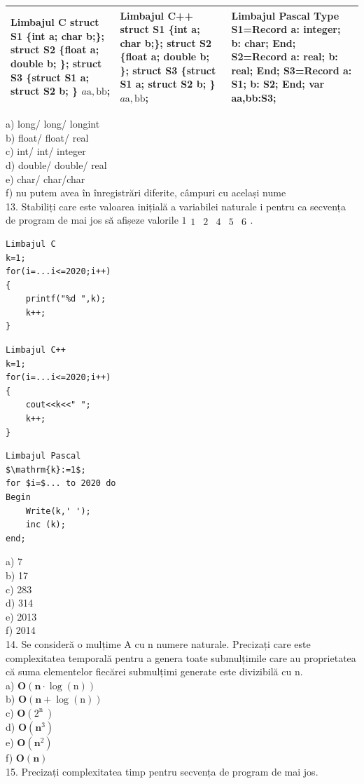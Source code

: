 \documentclass[10pt]{article}
\begin{document}
\begin{center}
\begin{tabular}{|l|l|l|}
\hline
Limbajul C struct S1 \{int a; char b;\}; struct S2 \{float a; double b; \}; struct S3 \{struct S1 a; struct S2 b; \} $a \mathrm{a}, \mathrm{bb}$; & Limbajul C++ struct S1 \{int a; char b;\}; struct S2 \{float a; double b; \}; struct S3 \{struct S1 a; struct S2 b; \} $a \mathrm{a}, \mathrm{bb}$; & Limbajul Pascal Type S1=Record a: integer; b: char; End; S2=Record a: real; b: real; End; S3=Record a: S1; b: S2; End; var aa,bb:S3; \\
\hline
\end{tabular}
\end{center}

a) long/ long/ longint\\
b) float/ float/ real\\
c) int/ int/ integer\\
d) double/ double/ real\\
e) char/ char/char\\
f) nu putem avea în înregistrări diferite, câmpuri cu același nume\\
13. Stabiliți care este valoarea inițială a variabilei naturale i pentru ca secvența de program de mai jos să afișeze valorile $1 \begin{array}{llllll}1 & 2 & 4 & 5 & 6\end{array}$.

\begin{verbatim}
Limbajul C
k=1;
for(i=...i<=2020;i++)
{
    printf("%d ",k);
    k++;
}
\end{verbatim}

\begin{verbatim}
Limbajul C++
k=1;
for(i=...i<=2020;i++)
{
    cout<<k<<" ";
    k++;
}
\end{verbatim}

\begin{verbatim}
Limbajul Pascal
$\mathrm{k}:=1$;
for $i=$... to 2020 do
Begin
    Write(k,' ');
    inc (k);
end;
\end{verbatim}

a) 7\\
b) 17\\
c) 283\\
d) 314\\
e) 2013\\
f) 2014\\
14. Se consideră o mulțime A cu n numere naturale. Precizați care este complexitatea temporală pentru a genera toate submulțimile care au proprietatea că suma elementelor fiecărei submulțimi generate este divizibilă cu n.\\
a) $\mathbf{O}(\mathbf{n} \cdot \log (\mathrm{n}))$\\
b) $\mathbf{O}(\mathbf{n}+\log (\mathrm{n}))$\\
c) $\mathbf{O}\left(2^{\text {n }}\right)$\\
d) $\mathbf{O}\left(\mathbf{n}^{3}\right)$\\
e) $\mathbf{O}\left(\mathbf{n}^{2}\right)$\\
f) $\mathbf{O}(\mathbf{n})$\\
15. Precizați complexitatea timp pentru secvența de program de mai jos.
\end{document}
